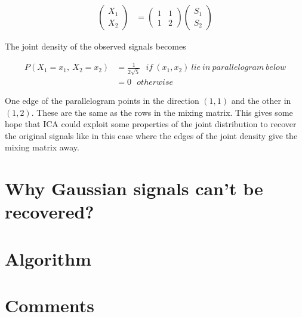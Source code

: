\documentclass[11pt, a4paper]{article}
\begin{document}
\begin{align*}
	\begin{pmatrix} 
	X_1 \\ 
	X_2 
	\end{pmatrix} & = 
	\begin{pmatrix} 
	1             & 1 \\ 
	1             & 2 
	\end{pmatrix}
	\begin{pmatrix} 
	S_1 \\ 
	S_2
	\end{pmatrix}
\end{align*}

The joint density of the observed signals becomes

\begin{align*}
	P(X_1=x_1,\ X_2=x_2) & = \frac{1}{2\sqrt{5}}\ \ \ if\ (x_1, x_2)\ lie\ in\  parallelogram\ below \\
	                     & = 0\ \ \ otherwise                                                        
\end{align*}


\begin{figure}[htbp]
	\centering
\end{figure}

\FloatBarrier

One edge of the parallelogram points in the direction $(1, 1)$ and the other in $(1, 2)$. These are the same as the rows in the mixing matrix. This gives some hope that ICA could exploit some properties of the joint distribution to recover the original signals like in this case where the edges of the joint density give the mixing matrix away. 

\section{Why Gaussian signals can't be recovered?}

\section{Algorithm}

\section{Comments}
\end{document}
